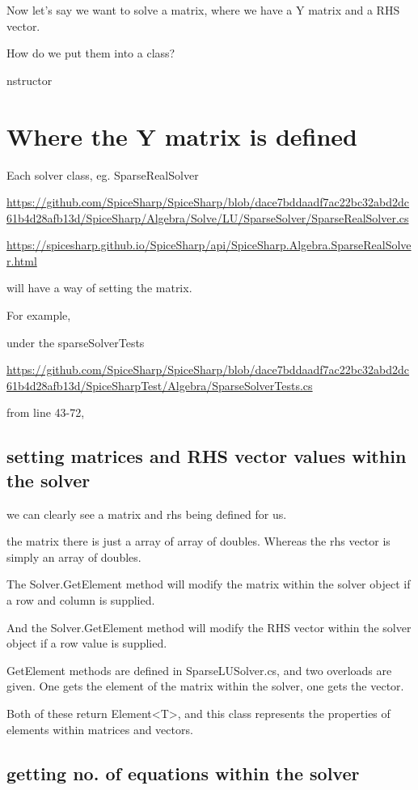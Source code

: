 \documentclass[12pt]{article}
\renewcommand{\_}{\kern-1.5pt\textunderscore\kern-1.5pt}
\begin{document}
Now let's say we want to solve a matrix, where we have a Y matrix and a RHS vector.

How do we put them into a class?

nstructor\section{Where the Y matrix is defined}

Each solver class, eg. SparseRealSolver

\url{https://github.com/SpiceSharp/SpiceSharp/blob/dace7bddaadf7ac22bc32abd2dc61b4d28afb13d/SpiceSharp/Algebra/Solve/LU/SparseSolver/SparseRealSolver.cs}

\url{https://spicesharp.github.io/SpiceSharp/api/SpiceSharp.Algebra.SparseRealSolver.html}

will have a way of setting the matrix.

For example,

under the sparseSolverTests

\url{https://github.com/SpiceSharp/SpiceSharp/blob/dace7bddaadf7ac22bc32abd2dc61b4d28afb13d/SpiceSharpTest/Algebra/SparseSolverTests.cs}

from line 43-72, 

\subsection{setting matrices and RHS vector values within the solver}

we can clearly see a matrix and rhs being defined for us.

the matrix there is just a array of array of doubles. Whereas the rhs vector is simply an array of doubles. 

The Solver.GetElement method will modify the matrix within the solver object if a row and column is supplied.

And the Solver.GetElement method will modify the RHS vector within the solver object if a row value is supplied.

GetElement methods are defined in SparseLUSolver.cs, and two overloads are given. One gets the element of the matrix within the solver, one gets the vector.

Both of these return Element<T>, and this class represents the properties of elements within matrices and vectors.

\subsection{getting no. of equations within the solver}
\end{document}
